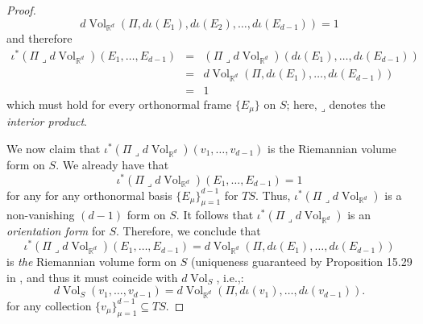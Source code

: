 \documentclass{article}
\renewcommand\det{\operatorname{det}}
\newcommand{\R}{\mathbb{R}}
\newcommand{\iprod}{\mathbin{\lrcorner}}
\theoremstyle{theorem}
\newcommand{\Vol}{\operatorname{Vol}}
\begin{document}
\begin{proof}
\begin{equation*}
    d\Vol_{\R^d}(\Pi,d\iota(E_1),d\iota(E_2),\dots,d\iota(E_{d-1})) = 1
\end{equation*}
and therefore
\begin{eqnarray*}
     \iota^* (\Pi  \iprod d\Vol_{\R^d})(E_1,\dots, E_{d-1})&=& (\Pi  \iprod d\Vol_{\R^d})(d\iota(E_1),\dots, d\iota(E_{d-1})) \\
     &=& d\Vol_{\R^d}(\Pi, d\iota(E_1),\dots, d\iota(E_{d-1})) \\
    &=& 1
\end{eqnarray*}
which must hold for every orthonormal frame $\{E_\mu\}$ on $S$; here, $\iprod$ denotes the \textit{interior product}.

We now claim that $\iota^* (\Pi \iprod  d\Vol_{\R^d})(v_1,\dots, v_{d-1})$ is the Riemannian volume form on $S$. We already have that
\begin{equation*}
    \iota^* (\Pi  \iprod d\Vol_{\R^d})(E_1,\dots, E_{d-1}) = 1
\end{equation*}
for any for any orthonormal basis $\{ E_{\mu} \}_{\mu=1}^{d-1}$ for $T S$. Thus, $\iota^* (\Pi  \iprod d\Vol_{\R^d})$ is a non-vanishing $(d-1)$ form on $S$. It follows that $\iota^* (\Pi  \iprod d\Vol_{\R^d})$ is an \textit{orientation form} for $S$. Therefore, we conclude that 
\begin{equation*}
    \iota^* (\Pi  \iprod d\Vol_{\R^d})(E_1,\dots, E_{d-1}) = d\Vol_{\R^d}(\Pi, d\iota(E_1),\dots, d\iota(E_{d-1}))
\end{equation*}
is \textit{the} Riemannian volume form on $S$ (uniqueness guaranteed by Proposition 15.29 in \cite{lee2013smooth}, and thus it must coincide with  $d\Vol_S$, i.e.,:
\begin{equation*}
    d\Vol_S(v_1,\dots, v_{d-1}) = d\Vol_{\R^d}(\Pi, d\iota(v_1),\dots, d\iota(v_{d-1})).
\end{equation*}
for any collection $\{v_\mu\}_{\mu=1}^{d-1} \subseteq TS$. 
\end{proof}




\end{document}
